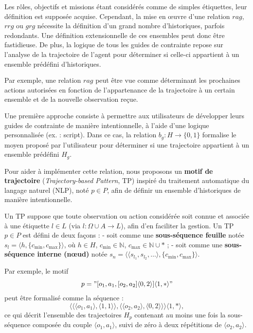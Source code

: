 Les rôles, objectifs et missions étant considérés comme de simples étiquettes, leur définition est supposée acquise. Cependant, la mise en œuvre d'une relation $rag$, $rrg$ ou $grg$ nécessite la définition d'un grand nombre d'historiques, parfois redondants. Une définition extensionnelle de ces ensembles peut donc être fastidieuse. De plus, la logique de tous les guides de contrainte repose sur l'analyse de la trajectoire de l'agent pour déterminer si celle-ci appartient à un ensemble prédéfini d'historiques.

Par exemple, une relation $rag$ peut être vue comme déterminant les prochaines actions autorisées en fonction de l'appartenance de la trajectoire à un certain ensemble et de la nouvelle observation reçue.

Une première approche consiste à permettre aux utilisateurs de développer leurs guides de contrainte de manière intentionnelle, à l'aide d'une logique personnalisée (ex. : script). Dans ce cas, la relation $b_g: H \to \{0,1\}$ formalise le moyen proposé par l'utilisateur pour déterminer si une trajectoire appartient à un ensemble prédéfini $H_g$.

Pour aider à implémenter cette relation, nous proposons un \textbf{motif de trajectoire} (\textit{Trajectory-based Pattern}, TP) inspiré du traitement automatique du langage naturel (NLP), noté $p \in P$, afin de définir un ensemble d'historiques de manière intentionnelle.

Un TP suppose que toute observation ou action considérée soit connue et associée à une étiquette $l \in L$ (via $l: \Omega \cup A \to L$), afin d'en faciliter la gestion. Un TP $p \in P$ est défini de deux façons :
- soit comme une \textbf{sous-séquence feuille} notée $s_l = \langle h, \{c_{\text{min}}, c_{\text{max}}\} \rangle$, où $h \in H$, $c_{\text{min}} \in \mathbb{N}$, $c_{\text{max}} \in \mathbb{N} \cup *$ ;
- soit comme une \textbf{sous-séquence interne (nœud)} notée $s_n = \langle \langle s_{l_1}, s_{l_2}, \dots \rangle, \{c_{\text{min}}, c_{\text{max}}\} \rangle$.

Par exemple, le motif 
\[
    p = "[o_1,a_1,[o_2,a_2]\langle0,2\rangle]\langle1,*\rangle"
\]
peut être formalisé comme la séquence :
\[
    \langle \langle \langle o_1,a_1 \rangle, \langle 1,1 \rangle \rangle, \langle \langle o_2,a_2 \rangle, \langle 0,2 \rangle \rangle \rangle \langle 1,* \rangle,
\]
ce qui décrit l'ensemble des trajectoires $H_p$ contenant au moins une fois la sous-séquence composée du couple $\langle o_1, a_1 \rangle$, suivi de zéro à deux répétitions de $\langle o_2, a_2 \rangle$.

